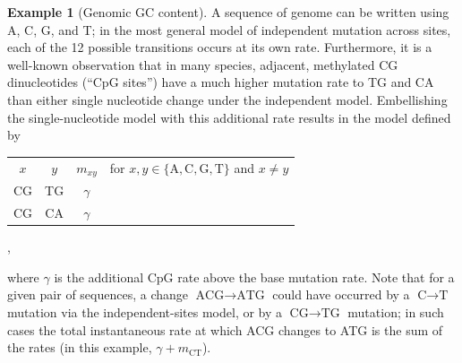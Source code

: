 \documentclass{article}
\newcommand{\nA}{\mbox{A}}  %
\newcommand{\nC}{\mbox{C}}
\newcommand{\nG}{\mbox{G}}
\newcommand{\nT}{\mbox{T}}
\theoremstyle{plain}
\theoremstyle{definition}
\newtheorem{example}{Example}[section]
\begin{document}
\begin{example}[Genomic GC content]
    A sequence of genome can be written using A, C, G, and T;
    in the most general model of independent mutation across sites, each of the 12 possible transitions occurs at its own rate.
    Furthermore, it is a well-known observation that in many species,
    adjacent, methylated CG dinucleotides (``CpG sites'') have a much higher mutation rate to TG and CA
    than either single nucleotide change under the independent model.
    Embellishing the single-nucleotide model with this additional rate results in the model defined by
    \begin{center}
      \begin{tabular}{c@{\quad$\to$\quad}c@{\quad at rate\quad }cc}
        $x$  &  $y$  &  $m_{xy}$ & for $x, y \in \{\nA,\nC,\nG,\nT\}$ and $x \neq y$ \\
        \nC\nG   &  \nT\nG   &  $\gamma$ & \\
        \nC\nG   &  \nC\nA   &  $\gamma$ &
      \end{tabular},
    \end{center}
    where $\gamma$ is the additional CpG rate above the base mutation rate.
    Note that for a given pair of sequences,
    a change $\nA\nC\nG \to \nA\nT\nG$ could have occurred by a $\nC \to \nT$ mutation
    via the independent-sites model,
    or by a $\nC\nG \to \nT\nG$ mutation;
    in such cases
    the total instantaneous rate at which ACG changes to ATG is the sum of the rates
    (in this example, $\gamma + m_{\nC\nT}$).


\end{example}
\end{document}
